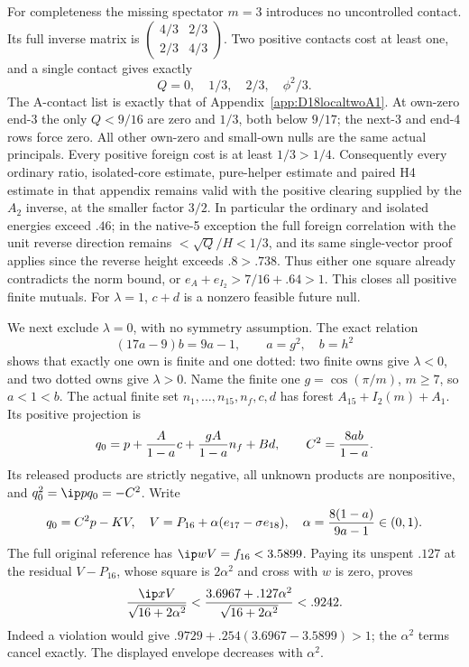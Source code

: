 For completeness the missing spectator \(m=3\) introduces no
uncontrolled contact.  Its full inverse matrix is
\(\left(\begin{smallmatrix}4/3&2/3\\2/3&4/3\end{smallmatrix}\right)\).
Two positive contacts cost at least one, and a single contact gives
exactly
\[
                  Q=0,\quad1/3,\quad2/3,\quad\phi^2/3 .
\]
The A-contact list is exactly that of
Appendix~\ref{app:D18localtwoA1}.
At own-zero end-3 the only \(Q<9/16\) are zero and \(1/3\),
both below \(9/17\); the next-3 and end-4 rows force zero.
All other own-zero and small-own nulls are the same actual principals.
Every positive foreign cost is at least \(1/3>1/4\).
Consequently every ordinary ratio, isolated-core estimate,
pure-helper estimate and paired H4 estimate in that appendix
remains valid with the positive clearing supplied by the
\(A_2\) inverse, at the smaller factor \(3/2\).
In particular the ordinary and isolated energies exceed \(.46\);
in the native-5 exception the full foreign correlation with the
unit reverse direction remains \(<\sqrt Q/H<1/3\),
and its same single-vector proof applies since the reverse height
exceeds \(.8>.738\).
Thus either one square already contradicts the norm bound, or
\(e_A+e_{I_2}>7/16+.64>1\).
This closes all positive finite mutuals.
For \(\lambda=1\), \(c+d\) is a nonzero feasible future null.

We next exclude \(\lambda=0\), with no symmetry assumption.
The exact relation
\[
 (17a-9)b=9a-1,\qquad a=g^2,\quad b=h^2
\]
shows that exactly one own is finite and one dotted: two finite
owns give \(\lambda<0\), and two dotted owns give \(\lambda>0\).
Name the finite one \(g=\cos(\pi/m)\), \(m\ge7\), so \(a<1<b\).
The actual finite set \(n_1,\ldots,n_{15},n_f,c,d\) has
forest \(A_{15}+I_2(m)+A_1\).
Its positive projection is
\[
 q_0=p+{A\over1-a}c+{gA\over1-a}n_f+Bd,\qquad
 C^2={8ab\over1-a}.
\]
Its released products are strictly negative, all unknown products
are nonpositive, and \(q_0^2=\ip p{q_0}=-C^2\).
Write
\[
 q_0=C^2p-KV,\quad V=P_{16}+\alpha(e_{17}-\sigma e_{18}),
 \quad \alpha={8(1-a)\over9a-1}\in(0,1).
\]
The full original reference has
\(\ip wV=f_{16}<3.5899\).
Paying its unspent \(.127\) at the residual \(V-P_{16}\),
whose square is \(2\alpha^2\) and cross with \(w\) is zero,
proves
\[
 {\ip xV\over\sqrt{16+2\alpha^2}}
 <{3.6967+.127\alpha^2\over\sqrt{16+2\alpha^2}}<.9242.
\]
Indeed a violation would give
\(.9729+.254(3.6967-3.5899)>1\);
the \(\alpha^2\) terms cancel exactly.
The displayed envelope decreases with \(\alpha^2\).

